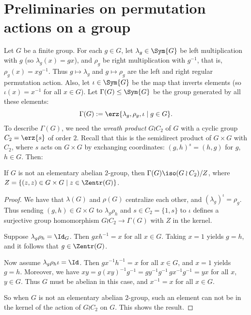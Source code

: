 \section{Preliminaries on permutation actions on a group}
Let $G$ be a finite group.
For each $g\in G$, let $\lambda_g\in \Sym{G}$ 
be left multiplication with $g$
(so $\lambda_g(x)= gx$),
and $\rho_g$ be right multiplication
with $g^{-1}$, that is, $\rho_g(x)= xg^{-1}$.
Thus $g\mapsto \lambda_g$ and $g\mapsto \rho_g$ are 
the left and right regular permutation action.
Also, let $\iota\in \Sym{G}$ be the map that 
inverts elements (so $\iota(x)= x^{-1}$ for all $x\in G$).
Let $\Gamma(G)\leq \Sym{G}$ be the group generated by all these
elements:
\[ \Gamma(G):= \erz{\lambda_g, \rho_g, \iota
                   \mid g\in G}.
\]
To describe $\Gamma(G)$, we need the
\emph{wreath product} $G\wr C_2$ 
of $G$ with a cyclic group~$C_2=\erz{s}$
of order $2$.
Recall that this is the semidirect product of
$G\times G$ with $C_2$, where $s$ acts on 
$G\times G$ by exchanging coordinates:
$(g,h)^s = (h,g)$ for $g$, $h\in G$.
Then:

\begin{lemma}
  If $G$ is not an elementary abelian $2$-group,
  then $\Gamma(G) \iso (G\wr C_2)/Z$,
  where $Z = \{(z,z)\in G \times G \mid z \in \Zentr(G)\}$.
\end{lemma}

\begin{proof}
  We have that $\lambda(G)$ and $\rho(G)$ centralize each other,
  and $(\lambda_g)^{\iota} = \rho_g$.
  Thus sending $(g,h)\in G\times G$ to
  $\lambda_g \rho_h$ and $s\in C_2 = \{1,s\}$
  to $\iota$ defines a surjective group homomorphism
  $G\wr C_2 \to \Gamma(G)$
  with $Z$ in the kernel.
  
  Suppose $\lambda_g \rho_h = \Id_G$.
  Then $gxh^{-1} = x$ for all $x\in G$.
  Taking $x=1$ yields $g=h$, 
  and it follows that  $g\in \Zentr(G)$.
  
  Now assume $\lambda_g \rho_h \iota = \Id$.
  Then $gx^{-1}h^{-1} = x$ for all $x\in G$,
  and $x=1$ yields $g=h$.
  Moreover, we have
  $xy = g (xy)^{-1} g^{-1}
      = g y^{-1} g^{-1} \, g x^{-1} g^{-1}
      = y x$
  for all $x$, $y\in G$.
  Thus $G$ must be abelian in this case, and
  $x^{-1} = x$ for all $x\in G$.
    
  So when $G$ is not an elementary abelian $2$-group,
  such an element can not be in the kernel of the action
  of $G\wr C_2$ on $G$.
  This shows the result.
\end{proof}

